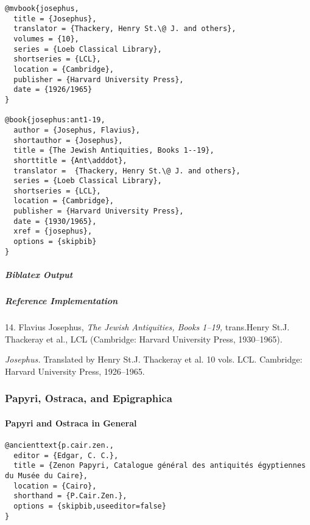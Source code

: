 \documentclass[a4paper]{article}
\newenvironment{biboutput}{%
  \subparagraph{Biblatex Output}
}{\color{black}}
\newenvironment{refimp}{%
  \subparagraph{Reference Implementation}
  \color{reference-colour}
  \rm
}{\par\color{black}}
\begin{document}
\begin{lstlisting}
@mvbook{josephus,
  title = {Josephus},
  translator = {Thackery, Henry St.\@ J. and others},
  volumes = {10},
  series = {Loeb Classical Library},
  shortseries = {LCL},
  location = {Cambridge},
  publisher = {Harvard University Press},
  date = {1926/1965}
}

@book{josephus:ant1-19,
  author = {Josephus, Flavius},
  shortauthor = {Josephus},
  title = {The Jewish Antiquities, Books 1--19},
  shorttitle = {Ant\adddot},
  translator =  {Thackery, Henry St.\@ J. and others},
  series = {Loeb Classical Library},
  shortseries = {LCL},
  location = {Cambridge},
  publisher = {Harvard University Press},
  date = {1930/1965},
  xref = {josephus},
  options = {skipbib}
}
\end{lstlisting}

\begin{biboutput}
\end{biboutput}

\begin{refimp}
  \hspace*{\bibindent}14. Flavius Josephus, \emph{The Jewish Antiquities,
  Books 1–19,} trans.\@ Henry St.\@ J. Thackeray et al., LCL (Cambridge:
  Harvard University Press, 1930–1965).

  \hangindent\bibindent \emph{Josephus.} Translated by Henry St.\@ J. Thackeray
  et al. 10 vols. LCL. Cambridge: Harvard University Press, 1926–1965.

\end{refimp}

\subsubsection{Papyri, Ostraca, and Epigraphica}

\paragraph{Papyri and Ostraca in General}

\begin{lstlisting}
@ancienttext{p.cair.zen.,
  editor = {Edgar, C. C.},
  title = {Zenon Papyri, Catalogue général des antiquités égyptiennes du Musée du Caire},
  location = {Cairo},
  shorthand = {P.Cair.Zen.},
  options = {skipbib,useeditor=false}
}
\end{lstlisting}
\end{document}
